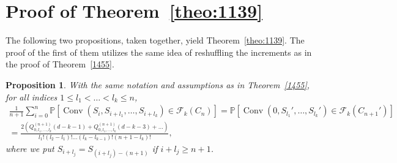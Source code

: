 \documentclass[12pt, reqno]{amsart}
\theoremstyle{plain}
\newtheorem{proposition}[theorem]{Proposition}
\theoremstyle{definition}
\theoremstyle{remark}
\begin{document}
\section{Proof of Theorem~\ref{theo:1139}}\label{sec:proof_shifted}
The following two propositions, taken together, yield Theorem~\ref{theo:1139}. The proof of the first of them utilizes the same idea of reshuffling the increments as in the proof of Theorem~\ref{1455}.
\begin{proposition}\label{prop:shift}
With the same notation and assumptions as in Theorem~\ref{1455}, for all indices $1\leq l_1 < \ldots < l_k \leq n$,
\begin{multline}\label{eq:shift_faces_statement}
\frac 1 {n+1} \sum_{i=0}^n {\mathbb{P}}[{\mathop{\mathrm{Conv}}\nolimits}(S_{i}, S_{i+l_1},\ldots, S_{i+l_{k}})\in {\mathcal{F}}_k(C_n)]
= {\mathbb{P}}[{\mathop{\mathrm{Conv}}\nolimits}(0, S_{l_1}',\ldots, S_{l_{k}}')\in {\mathcal{F}}_k(C_{n+1}')]\\
=
\frac{
2(Q_{0, l_1,\ldots,l_{k}}^{(n+1)}(d-k-1) + Q_{0,l_1,\ldots,l_{k}}^{(n+1)}(d-k-3)+\ldots)
}{l_1! (l_2-l_1)!\ldots  (l_{k}-l_{k-1})! (n+1-l_{k})!}
,
\end{multline}
where we put $S_{i+l_j} = S_{(i+l_j)-(n+1)}$ if $i+l_j\geq n+1$. 
\end{proposition}
\end{document}
